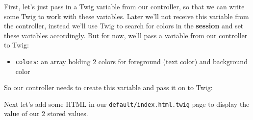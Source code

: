 \documentclass[a4paperpaper,openright]{book}
\newenvironment{Shaded}{}{}
\newcommand{\KeywordTok}[1]{\textcolor[rgb]{0.00,0.44,0.13}{\textbf{#1}}}
\newcommand{\NormalTok}[1]{#1}
\newcommand{\OtherTok}[1]{\textcolor[rgb]{0.00,0.44,0.13}{#1}}
\newcommand{\StringTok}[1]{\textcolor[rgb]{0.25,0.44,0.63}{#1}}
\begin{document}
First, let's just pass in a Twig variable from our controller, so that
we can write some Twig to work with these variables. Later we'll not
receive this variable from the controller, instead we'll use Twig to
search for colors in the \textbf{session} and set these variables
accordingly. But for now, we'll pass a variable from our controller to
Twig:

\begin{itemize}
\item
  \texttt{colors}: an array holding 2 colors for foreground (text color)
  and background color

\begin{Shaded}
\end{Shaded}
\end{itemize}

So our controller needs to create this variable and pass it on to Twig:

\begin{Shaded}
\end{Shaded}

Next let's add some HTML in our \texttt{default/index.html.twig} page to
display the value of our 2 stored values.

\begin{Shaded}
\end{Shaded}
\end{document}
